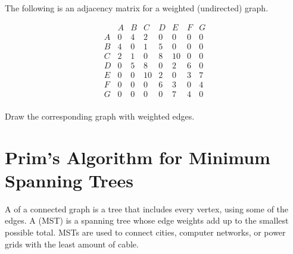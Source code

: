 \begin{Exercise}[title={Adjacency Matrix Exercise}, label={ex:adjacency1}]

	The following is an adjacency matrix for a weighted (undirected) graph.

	\[
		\begin{array}{c|ccccccc}
			  & A & B & C  & D & E  & F & G \\
			\hline
			A & 0 & 4 & 2  & 0 & 0  & 0 & 0 \\
			B & 4 & 0 & 1  & 5 & 0  & 0 & 0 \\
			C & 2 & 1 & 0  & 8 & 10 & 0 & 0 \\
			D & 0 & 5 & 8  & 0 & 2  & 6 & 0 \\
			E & 0 & 0 & 10 & 2 & 0  & 3 & 7 \\
			F & 0 & 0 & 0  & 6 & 3  & 0 & 4 \\
			G & 0 & 0 & 0  & 0 & 7  & 4 & 0 \\
		\end{array}
	\]

	Draw the corresponding graph with weighted edges.

\end{Exercise}
\begin{Answer}[ref={ex:adjacency1}]



\end{Answer}
\section{Prim's Algorithm for Minimum Spanning Trees}
A  of a connected graph is a tree that includes every vertex, using some of the edges. A  (MST) is a spanning tree whose edge weights add up to the smallest possible total. MSTs are used to connect cities, computer networks, or power grids with the least amount of cable.

